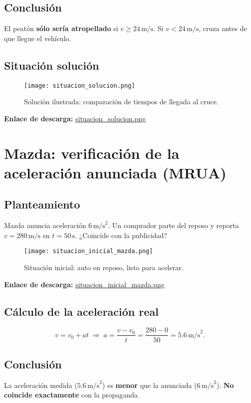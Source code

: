 \documentclass[12pt,a4paper,openany]{book} %
\begin{document}
\section{Conclusión}
El peatón \textbf{sólo sería atropellado} si \(v\ge 24\,\text{m/s}\).
Si \(v<24\,\text{m/s}\), cruza antes de que llegue el vehículo.

\section{Situación solución}
\begin{figure}[h!]
  \centering
  \texttt{[image: situacion\_solucion.png]}
  \caption{Solución ilustrada: comparación de tiempos de llegada al cruce.}
\end{figure}
\noindent\textbf{Enlace de descarga:} \href{run:imagenes/situacion_solucion.png}{situacion\_solucion.png}

\chapter{Mazda: verificación de la aceleración anunciada (MRUA)}

\section{Planteamiento}
Mazda anuncia aceleración \(6\,\text{m/s}^2\).
Un comprador parte del reposo y reporta \(v=280\,\text{m/s}\) en \(t=50\,\text{s}\).
¿Coincide con la publicidad?

\begin{figure}[h!]
  \centering
  \texttt{[image: situacion\_inicial\_mazda.png]}
  \caption{Situación inicial: auto en reposo, listo para acelerar.}
\end{figure}
\noindent\textbf{Enlace de descarga:} \href{run:imagenes/situacion_inicial_mazda.png}{situacion\_inicial\_mazda.png}

\section{Cálculo de la aceleración real}
\[
v = v_0 + a t \;\Rightarrow\; a=\frac{v-v_0}{t}
=\frac{280-0}{50}=5.6\,\text{m/s}^2.
\]

\section{Conclusión}
La aceleración medida (\(5.6\,\text{m/s}^2\)) es \textbf{menor} que la anunciada (\(6\,\text{m/s}^2\)).
\textbf{No coincide exactamente} con la propaganda.
\end{document}
